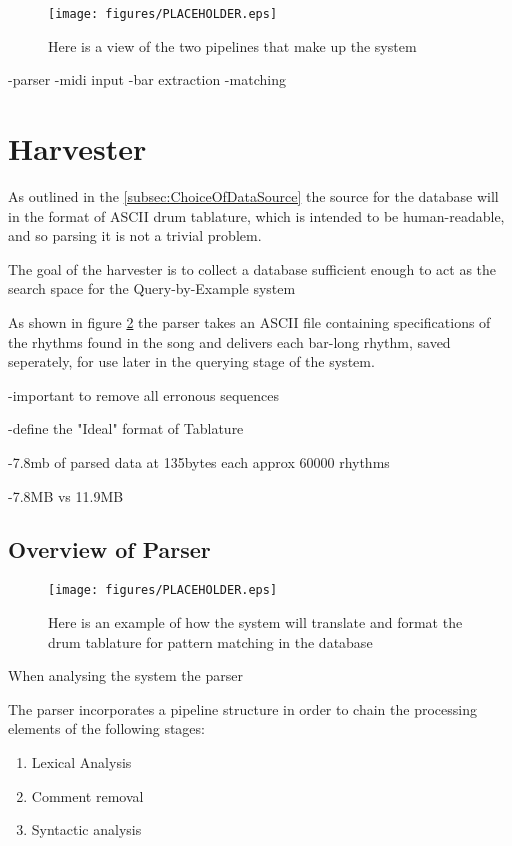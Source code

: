 \documentclass[12pt,twoside,notitlepage]{report}
\begin{document}
	\begin{figure}[h]
			\centerline{\texttt{[image: figures/PLACEHOLDER.eps]}}
			\caption{\label{SystemDesign} Here is a view of the two pipelines that make up the system}
\end{figure}
	-parser
	-midi input
	-bar extraction
	-matching
	\section{Harvester}
	As outlined in the \ref{subsec:ChoiceOfDataSource} the source for the database will in the format of ASCII drum tablature, which is intended to be human-readable, and so parsing it is not a trivial problem. 
	
	The goal of the harvester is to collect a database sufficient enough to act as the search space for the Query-by-Example system
	
	As shown in figure \ref{exampleIdealParse} the parser takes an ASCII file containing specifications of the rhythms found in the song and delivers each bar-long rhythm, saved seperately, for use later in the querying stage of the system.
	
	
	-important to remove all erronous sequences

	-define the "Ideal" format of Tablature

	-7.8mb of parsed data at 135bytes each approx 60000 rhythms

	-7.8MB vs 11.9MB
	
		\subsection{Overview of Parser}
\begin{figure}[h]
			\centerline{\texttt{[image: figures/PLACEHOLDER.eps]}}
			\caption{\label{exampleIdealParse} Here is an example of how the system will translate and format the drum tablature for pattern matching in the database}
\end{figure}

		When analysing the system the parser

		The parser incorporates a pipeline structure in order to chain the processing elements of the following stages:
		\begin{enumerate}
			\item{Lexical Analysis}
			\item{Comment removal}
			\item{Syntactic analysis}
		\end{enumerate}
		
\end{document}
